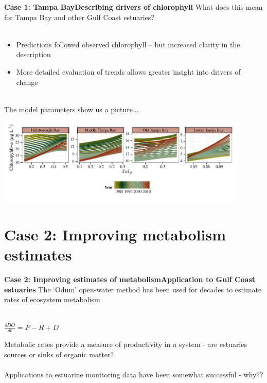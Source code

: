 \documentclass[serif]{beamer}\usepackage[]{graphicx}\usepackage[]{color}
\begin{document}
\begin{frame}{\textbf{Case 1: Tampa Bay}}{\textbf{Describing drivers of chlorophyll}}
What does this mean for Tampa Bay and other Gulf Coast estuaries?\\~\\
\begin{itemize}
\item Predictions followed observed chlorophyll -- but increased clarity in the description
\item More detailed evaluation of trends allows greater insight into drivers of change\\~\\
\end{itemize}
The model parameters show us a picture...
\centerline{\includegraphics[width = 0.9\textwidth]{fig/title_plo2.pdf}}
\end{frame}

\section{Case 2: Improving metabolism estimates}

\begin{frame}{\textbf{Case 2: Improving estimates of metabolism}}{\textbf{Application to Gulf Coast estuaries}}
The `Odum' open-water method has been used for decades to estimate rates of ecosystem metabolism \scriptsize \cite{Odum56} \\~\\
\normalsize
\begin{center}
$\frac{\delta DO}{\delta t} = P - R + D$
\end{center}
Metabolic rates provide a measure of productivity in a system - are estuaries sources or sinks of organic matter? \scriptsize \cite{Caffrey14}
\normalsize \\~\\
Applications to estuarine monitoring data have been somewhat successful - why?? 
\end{frame}
\end{document}

